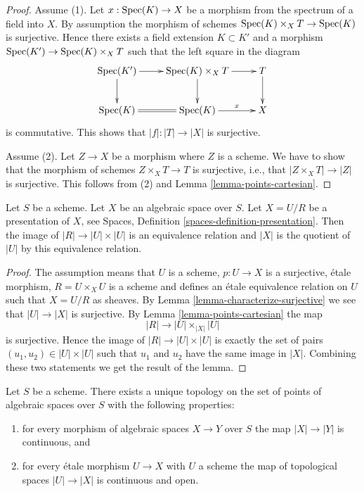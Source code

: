 \begin{proof}
Assume (1). Let $x : \mathop{\rm Spec}(K) \to X$ be a morphism
from the spectrum of a field into $X$. By assumption the morphism of
schemes $\mathop{\rm Spec}(K) \times_X T \to \mathop{\rm Spec}(K)$ is surjective.
Hence there exists a field extension $K \subset K'$ and a morphism
$\mathop{\rm Spec}(K') \to \mathop{\rm Spec}(K) \times_X T$ such that the left
square in the diagram
$$
\xymatrix{
\Spec(K') \ar[r] \ar[d] &
\Spec(K) \times_X T \ar[d] \ar[r] &
T \ar[d] \\
\Spec(K) \ar@{=}[r] &
\Spec(K) \ar[r]^-x & X
}
$$
is commutative. This shows that $|f| : |T| \to |X|$ is surjective.

\medskip\noindent
Assume (2). Let $Z \to X$ be a morphism where $Z$ is
a scheme. We have to show that the morphism of schemes $Z \times_X T \to T$
is surjective, i.e., that $|Z \times_X T| \to |Z|$ is surjective.
This follows from (2) and
Lemma \ref{lemma-points-cartesian}.
\end{proof}

\begin{lemma}
\label{lemma-points-presentation}
Let $S$ be a scheme.
Let $X$ be an algebraic space over $S$.
Let $X = U/R$ be a presentation of $X$, see
Spaces, Definition \ref{spaces-definition-presentation}.
Then the image of $|R| \to |U| \times |U|$ is an equivalence relation
and $|X|$ is the quotient of $|U|$ by this equivalence relation.
\end{lemma}

\begin{proof}
The assumption means that $U$ is a scheme, $p : U \to X$ is a surjective,
\'etale morphism, $R = U \times_X U$ is a scheme and defines an \'etale
equivalence relation on $U$ such that $X = U/R$ as sheaves. By
Lemma \ref{lemma-characterize-surjective}
we see that $|U| \to |X|$ is surjective. By
Lemma \ref{lemma-points-cartesian}
the map
$$
|R| \longrightarrow |U| \times_{|X|} |U|
$$
is surjective. Hence the image of $|R| \to |U| \times |U|$ is
exactly the set of pairs $(u_1, u_2) \in |U| \times |U|$
such that $u_1$ and $u_2$ have the same image in $|X|$.
Combining these two statements we get the result of the lemma.
\end{proof}

\begin{lemma}
\label{lemma-topology-points}
Let $S$ be a scheme. There exists a unique topology on the set of points
of algebraic spaces over $S$ with the following properties:
\begin{enumerate}
\item for every morphism of algebraic spaces $X \to Y$ over $S$
the map $|X| \to |Y|$ is continuous, and
\item for every \'etale morphism $U \to X$ with $U$ a scheme
the map of topological spaces $|U| \to |X|$ is continuous and open.
\end{enumerate}
\end{lemma}

